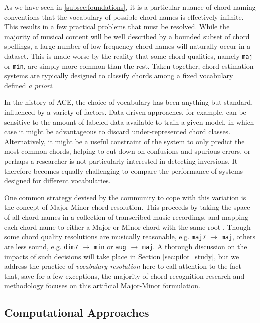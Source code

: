 As we have seen in \ref{subsec:foundations}, it is a particular nuance of chord naming conventions that the vocabulary of possible chord names is effectively infinite.
This results in a few practical problems that must be resolved.
While the majority of musical content will be well described by a bounded subset of chord spellings, a large number of low-frequency chord names will naturally occur in a dataset.
This is made worse by the reality that some chord qualities, namely \texttt{maj} or \texttt{min}, are simply more common than the rest.
Taken together, chord estimation systems are typically designed to classify chords among a fixed vocabulary defined \emph{a priori}.

In the history of ACE, the choice of vocabulary has been anything but standard, influenced by a variety of factors.
Data-driven approaches, for example, can be sensitive to the amount of labeled data available to train a given model, in which case it might be advantageous to discard under-represented chord classes.
Alternatively, it might be a useful constraint of the system to only predict the most common chords, helping to cut down on confusions and spurious errors, or perhaps a researcher is not particularly interested in detecting inversions.
It therefore becomes equally challenging to compare the performance of systems designed for different vocabularies.

One common strategy devised by the community to cope with this variation is the concept of Major-Minor chord resolution.
This proceeds by taking the space of all chord names in a collection of transcribed music recordings, and mapping each chord name to either a Major or Minor chord with the same root \cite{McVicar2013}.
Though some chord quality resolutions are musically reasonable, e.g. \texttt{maj7} $\to$ \texttt{maj}, others are less sound, e.g. \texttt{dim7} $\to$ \texttt{min} or \texttt{aug} $\to$ \texttt{maj}.
A thorough discussion on the impacts of such decisions will take place in Section \ref{sec:pilot_study}, but we address the practice of \emph{vocabulary resolution} here to call attention to the fact that, save for a few exceptions, the majority of chord recognition research and methodology focuses on this artificial Major-Minor formulation.


\subsection{Computational Approaches}
\label{subsec:computational_approaches}

